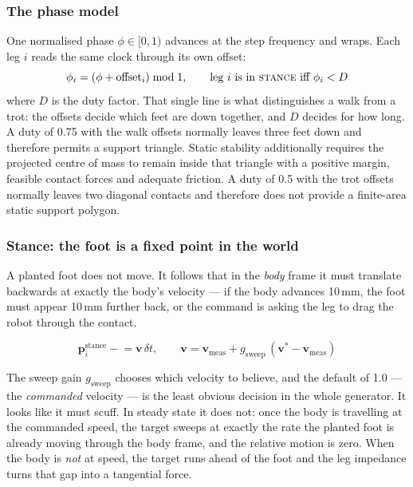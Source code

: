 \documentclass[11pt,a4paper]{article}
\begin{document}

\subsubsection{The phase model}

One normalised phase $\phi \in [0,1)$ advances at the step frequency and wraps.
Each leg $i$ reads the same clock through its own offset:
\[
  \phi_i = (\phi + \text{offset}_i) \bmod 1,
  \qquad
  \text{leg } i \text{ is in \textsc{stance} iff } \phi_i < D
\]
where $D$ is the duty factor. That single line is what distinguishes a walk
from a trot: the offsets decide which feet are down together, and $D$ decides
for how long. A duty of 0.75 with the walk offsets normally leaves three feet
down and therefore permits a support triangle. Static stability additionally
requires the projected centre of mass to remain inside that triangle with a
positive margin, feasible contact forces and adequate friction. A duty of 0.5
with the trot offsets normally leaves two diagonal contacts and therefore does
not provide a finite-area static support polygon.

\subsubsection{Stance: the foot is a fixed point in the world}

A planted foot does not move. It follows that in the \emph{body} frame it must
translate backwards at exactly the body's velocity --- if the body advances
10\,mm, the foot must appear 10\,mm further back, or the command is asking the
leg to drag the robot through the contact.

\[
  \mathbf{p}^{\text{stance}}_i \mathrel{-}= \mathbf{v}\,\delta t,
  \qquad
  \mathbf{v} = \mathbf{v}_{\text{meas}}
    + g_{\text{sweep}}\,(\mathbf{v}^{*} - \mathbf{v}_{\text{meas}})
\]

The sweep gain $g_{\text{sweep}}$ chooses which velocity to believe, and the
default of 1.0 --- the \emph{commanded} velocity --- is the least obvious
decision in the whole generator. It looks like it must scuff. In steady state
it does not: once the body is travelling at the commanded speed, the target
sweeps at exactly the rate the planted foot is already moving through the body
frame, and the relative motion is zero. When the body is \emph{not} at speed,
the target runs ahead of the foot and the leg impedance turns that gap into a
tangential force.
\end{document}
